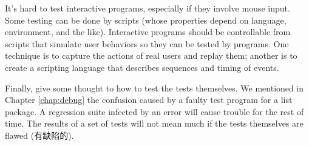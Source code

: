 It's hard to test interactive programs, especially if they involve mouse
input.  Some testing can be done by scripts (whose properties depend on
language, environment, and the like). Interactive programs should be
controllable from scripts that simulate user behaviors so they can be
tested by programs. One technique is to capture the actions of real users
and replay them; another is to create a scripting language that describes
sequences and timing of events.

Finally, give some thought to how to test the tests themselves. We
mentioned in Chapter \ref{chap:debug} the confusion caused by a faulty test
program for a list package.  A regression suite infected by an error will
cause trouble for the rest of time.  The results of a set of tests will not
mean much if the tests themselves are flawed (有缺陷的).
